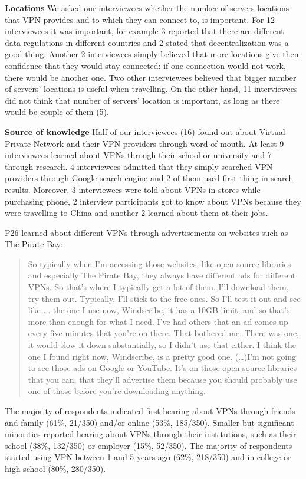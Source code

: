 \textbf{Locations} We asked our interviewees whether the number of servers
locations that VPN provides and to which they can connect to, is important.
For 12 interviewees it was important, for example 3 reported that there are
different data regulations in different countries and 2 stated that
decentralization was a good thing. Another 2 interviewees simply believed that
more locations give them confidence that they would stay connected: if one
connection would not work, there would be another one. Two other interviewees
believed that bigger number of servers’ locations is useful when travelling.
On the other hand, 11 interviewees did not think that number of servers’
location is important, as long as there would be couple of them (5).  

\textbf{Source of knowledge} Half of our interviewees (16) found out about
Virtual Private Network and their VPN providers through word of mouth. At
least 9 interviewees learned about VPNs through their school or university and
7 through research. 4 interviewees admitted that they simply searched VPN
providers through Google search engine and 2 of them used first thing in
search results. Moreover, 3 interviewees were told about VPNs in stores while
purchasing phone, 2 interview participants got to know about VPNs because they
were travelling to China and another 2 learned about them at their jobs.


P26 learned about different VPNs through advertisements on websites such as
The Pirate Bay: \begin{quote}So typically when I'm accessing those websites,
    like open-source libraries and especially The Pirate Bay, they always have
    different ads for different VPNs. So that's where I typically get a lot of
    them. I'll download them, try them out. Typically, I'll stick to the free
    ones. So I'll test it out and see like ... the one I use now, Windscribe,
    it has a 10GB limit, and so that's more than enough for what I need. I've
    had others that an ad comes up every five minutes that you're on there.
    That bothered me. There was one, it would slow it down substantially, so I
    didn't use that either. I think the one I found right now, Windscribe, is
    a pretty good one.  (\dots)I'm not going to see those ads on Google or
YouTube. It's on those open-source libraries that you can, that they'll
advertise them because you should probably use one of those before you're
downloading anything.\end{quote}

The majority of respondents indicated first hearing about VPNs through friends
and family (61\%, 21/350) and/or online (53\%, 185/350). Smaller but
significant minorities reported hearing about VPNs through their institutions,
such as their school (38\%, 132/350) or employer (15\%, 52/350). The majority
of respondents started using VPN between 1 and 5 years ago (62\%, 218/350) and
in college or high school (80\%, 280/350).

